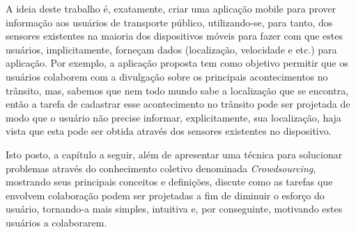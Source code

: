 A ideia deste trabalho é, exatamente, criar uma aplicação mobile para prover informação aos usuários de transporte público, utilizando-se, para tanto, dos sensores existentes na maioria dos dispositivos móveis para fazer com que estes usuários, implicitamente, forneçam dados (localização, velocidade e etc.) para aplicação. Por exemplo, a aplicação proposta tem como objetivo permitir que os usuários colaborem com a divulgação sobre os principais acontecimentos no trânsito, mas, sabemos que nem todo mundo sabe a localização que se encontra, então a tarefa de cadastrar esse acontecimento no trânsito pode ser projetada de modo que o usuário não precise informar, explicitamente, sua localização, haja vista que esta pode ser obtida através dos sensores existentes no dispositivo.

Isto posto, a capítulo a seguir, além de apresentar uma técnica para solucionar problemas através do conhecimento coletivo denominada \textit{Crowdsourcing}, mostrando seus principais conceitos e definições, discute como as tarefas que envolvem colaboração podem ser projetadas a fim de diminuir o esforço do usuário, tornando-a mais simples, intuitiva e, por conseguinte, motivando estes usuários a colaborarem.
